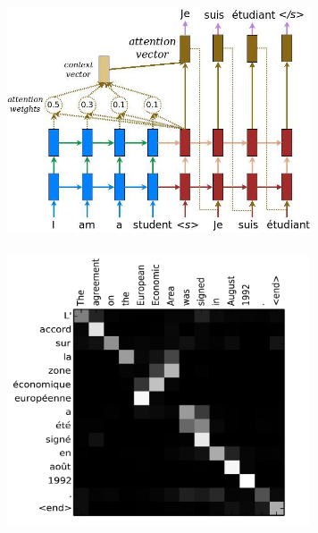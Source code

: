 \begin{minipage}{\linewidth}
\centering
\hspace*{-2cm}    
\begin{minipage}{9cm}
  \includegraphics[width=9cm, height=7cm]{images/attention_mechanism.jpg}
\end{minipage}%
\begin{minipage}{10cm}
  \centering
  \includegraphics[width=9cm, height=8cm]{images/bahdanau-fig3.png}
\end{minipage}
\end{minipage}\\ \\


